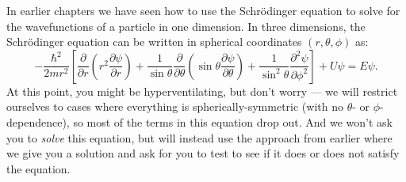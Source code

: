 In earlier chapters we have seen how to use the Schr\"odinger
equation to solve for the wavefunctions of a particle in one
dimension.  In three dimensions, the Schr\"{o}dinger equation
can be written in spherical coordinates $(r, \theta, \phi)$
as:
\begin{equation}
\label{eq:3Dschrodinger}
-\frac{\hbar^2}{2mr^2} \left[ \frac{\partial}{\partial r} \left( r^2
  \frac{\partial \psi}{\partial r} \right) + \frac{1}{\sin{\theta}}
  \frac{\partial}{\partial \theta} \left( \sin{\theta} \frac{\partial
    \psi}{\partial \theta} \right) + \frac{1}{\sin^2{\theta}}
  \frac{\partial^2 \psi}{\partial \phi^2} \right] + U \psi = E \psi.
\end{equation}
At this point, you might be hyperventilating, but don't worry --- we
will restrict ourselves to cases where everything is
spherically-symmetric (with no $\theta$- or $\phi$-dependence), so
most of the terms in this equation drop out.  And we won't ask you to
{\it solve} this equation, but will instead use the approach from
earlier where we give you a solution and ask for you to test to see if
it does or does not satisfy the equation.

